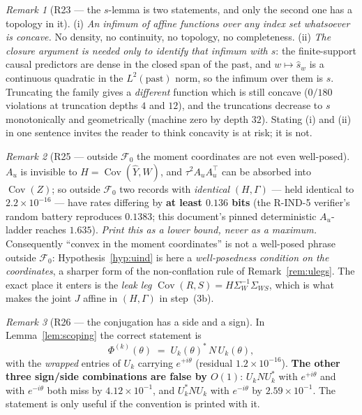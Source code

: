 \documentclass[11pt]{article}
\theoremstyle{definition}
\theoremstyle{remark}
\newtheorem{remark}{Remark}
\begin{document}
\begin{remark}[R23 --- the $s$-lemma is two statements, and only the
second one has a topology in it]
\label{rem:R23}
(i) \emph{An infimum of affine functions over any index set whatsoever
is concave.} No density, no continuity, no topology, no completeness.
(ii) \emph{The closure argument is needed only to identify that
infimum with $s$}: the finite-support causal predictors are dense in
the closed span of the past, and $w\mapsto\hat s_w$ is a continuous
quadratic in the $L^2(\text{past})$ norm, so the infimum over them is
$s$. Truncating the family gives a \emph{different} function which is
still concave ($0/180$ violations at truncation depths $4$ and $12$),
and the truncations decrease to $s$ monotonically and geometrically
(machine zero by depth $32$). Stating (i) and (ii) in one sentence
invites the reader to think concavity is at risk; it is not.
\end{remark}

\begin{remark}[R25 --- outside $\mathcal F_0$ the moment coordinates
are not even well-posed]
\label{rem:R25}
$A_u$ is invisible to $H=\operatorname{Cov}(\hat Y,W)$, and
$\tau^2A_uA_u^{\!\top}$ can be absorbed into $\operatorname{Cov}(Z)$;
so outside $\mathcal F_0$ two records with \emph{identical}
$(H,\Gamma)$ --- held identical to $2.2\times10^{-16}$ --- have rates
differing by \textbf{at least $0.136$ bits} (the R-IND-5 verifier's
random battery reproduces $0.1383$; this document's pinned
deterministic $A_u$-ladder reaches $1.635$). \emph{Print this as a
lower bound, never as a maximum.} Consequently ``convex in the moment
coordinates'' is not a well-posed phrase outside $\mathcal F_0$:
Hypothesis~\ref{hyp:uind} is here a \emph{well-posedness condition on
the coordinates}, a sharper form of the non-conflation rule of
Remark~\ref{rem:ulegs}. The exact place it enters is the \emph{leak
leg} $\operatorname{Cov}(R,S)=H\Sigma_W^{-1}\Sigma_{WS}$, which is
what makes the joint $J$ affine in $(H,\Gamma)$ in step~(3b).
\end{remark}

\begin{remark}[R26 --- the conjugation has a side and a sign]
\label{rem:R26}
In Lemma~\ref{lem:scoping} the correct statement is
\[
\Phi^{(k)}(\theta)\;=\;U_k(\theta)^\ast\,N\,U_k(\theta),
\]
with the \emph{wrapped} entries of $U_k$ carrying $e^{+i\theta}$
(residual $1.2\times10^{-16}$). \textbf{The other three sign/side
combinations are false by $O(1)$}: $U_kNU_k^\ast$ with $e^{+i\theta}$
and with $e^{-i\theta}$ both miss by $4.12\times10^{-1}$, and
$U_k^\ast NU_k$ with $e^{-i\theta}$ by $2.59\times10^{-1}$. The
statement is only useful if the convention is printed with it.
\end{remark}
\end{document}
